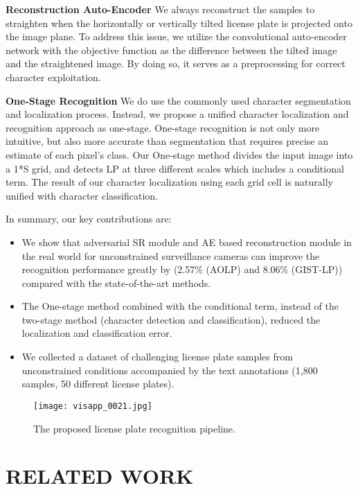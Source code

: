 \documentclass[a4paper,twoside]{article}
\begin{document}
    \textbf{Reconstruction Auto-Encoder} We always reconstruct the samples to straighten when the horizontally or vertically tilted license plate is projected onto the image plane. To address this issue, we utilize the convolutional auto-encoder network with the objective function as the difference between the tilted image and the straightened image. By doing so, it serves as a preprocessing for correct character exploitation. 
    
    \textbf{One-Stage Recognition} We do use the commonly used character segmentation and localization process. Instead, we propose a unified character localization and recognition approach as one-stage. One-stage recognition is not only more intuitive, but also more accurate than segmentation that requires precise an estimate of each pixel's class. Our One-stage method divides the input image into a 1*S grid, and detects LP at three different scales which includes a conditional term. The result of our character localization using each grid cell is naturally unified with character classification. 

    
In summary, our key contributions are:
    \begin{itemize}
      \item[] We show that adversarial SR module and AE based reconstruction module in the real world for unconstrained surveillance cameras can improve the recognition performance greatly by (2.57\% (AOLP) and 8.06\% (GIST-LP)) compared with the state-of-the-art methods.
      \item[] The One-stage method combined with the conditional term, instead of the two-stage method (character detection and classification), reduced the localization and classification error.
      \item[] We collected a dataset of challenging license plate samples from unconstrained conditions accompanied by the text annotations (1,800 samples, 50 different license plates).
    \end{itemize}

\begin{figure*}[t]
    \begin{center}
\texttt{[image: visapp\_0021.jpg]}
    \end{center}
       \caption{The proposed license plate recognition pipeline.}
    \label{fig:long}
    \label{fig:onecol}
    \end{figure*}

\section{\uppercase{Related Work}}
\end{document}
